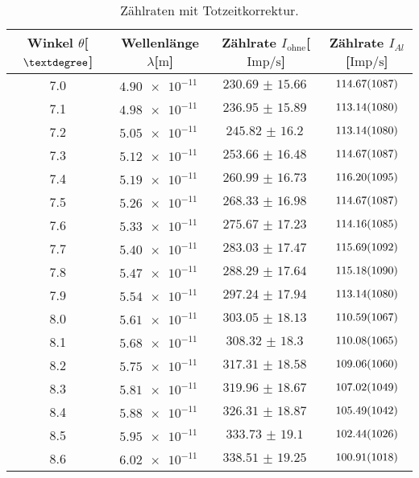 \begin{table}
\centering
\caption{Zählraten mit Totzeitkorrektur.}
\label{tab:korrektur}
\begin{tabular}{c c c c}
    \toprule
    Winkel $\theta$[$\textdegree$] & Wellenlänge $\lambda$[$\si{\meter}$] & Zählrate $I_{\text{ohne}}$[$\si{{\text{Imp}}\per\second}$] & Zählrate $I_{Al}$[$\si{{\text{Imp}}\per\second}$] \\
    \midrule
    7.0 &  $\SI{4.90e-11}{}$  & $\SI{230.69(1566)}{}$   &   $\SI{114.67 (1087)}{}$   \\
    7.1 &  $\SI{4.98e-11}{}$  & $\SI{236.95(1589)}{}$   &   $\SI{113.14 (1080)}{}$   \\
    7.2 &  $\SI{5.05e-11}{}$  & $\SI{245.82(1620)}{}$   &   $\SI{113.14 (1080)}{}$   \\ 
    7.3 &  $\SI{5.12e-11}{}$  & $\SI{253.66(1648)}{}$   &   $\SI{114.67 (1087)}{}$   \\ 
    7.4 &  $\SI{5.19e-11}{}$  & $\SI{260.99(1673)}{}$   &   $\SI{116.20 (1095)}{}$   \\ 
    7.5 &  $\SI{5.26e-11}{}$  & $\SI{268.33(1698)}{}$   &   $\SI{114.67 (1087)}{}$   \\ 
    7.6 &  $\SI{5.33e-11}{}$  & $\SI{275.67(1723)}{}$   &   $\SI{114.16 (1085)}{}$   \\ 
    7.7 &  $\SI{5.40e-11}{}$  & $\SI{283.03(1747)}{}$   &   $\SI{115.69 (1092)}{}$   \\       
    7.8 &  $\SI{5.47e-11}{}$  & $\SI{288.29(1764)}{}$   &   $\SI{115.18 (1090)}{}$   \\    
    7.9 &  $\SI{5.54e-11}{}$  & $\SI{297.24(1794)}{}$   &   $\SI{113.14 (1080)}{}$   \\    
    8.0 &  $\SI{5.61e-11}{}$  & $\SI{303.05(1813)}{}$   &   $\SI{110.59 (1067)}{}$   \\    
    8.1 &  $\SI{5.68e-11}{}$  & $\SI{308.32(1830)}{}$   &   $\SI{110.08 (1065)}{}$   \\    
    8.2 &  $\SI{5.75e-11}{}$  & $\SI{317.31(1858)}{}$   &   $\SI{109.06 (1060)}{}$   \\    
    8.3 &  $\SI{5.81e-11}{}$  & $\SI{319.96(1867)}{}$   &   $\SI{107.02 (1049)}{}$   \\    
    8.4 &  $\SI{5.88e-11}{}$  & $\SI{326.31(1887)}{}$   &   $\SI{105.49 (1042)}{}$   \\    
    8.5 &  $\SI{5.95e-11}{}$  & $\SI{333.73(1910)}{}$   &   $\SI{102.44 (1026)}{}$   \\    
    8.6 &  $\SI{6.02e-11}{}$  & $\SI{338.51(1925)}{}$   &   $\SI{100.91 (1018)}{}$  \\    

\end{tabular}
\end{table}
